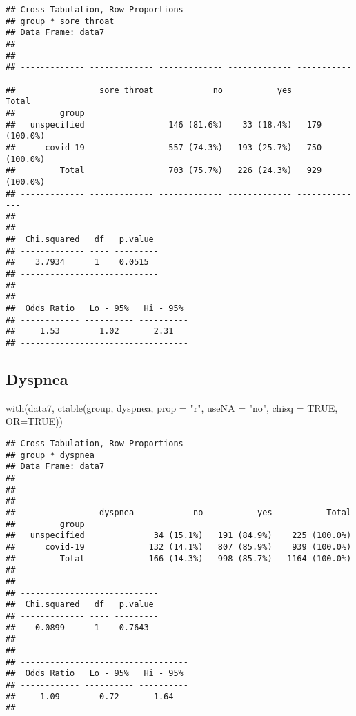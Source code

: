 \documentclass[
]{article}
\newenvironment{Shaded}{\begin{snugshade}}{\end{snugshade}}
\newcommand{\AttributeTok}[1]{\textcolor[rgb]{0.77,0.63,0.00}{#1}}
\newcommand{\ConstantTok}[1]{\textcolor[rgb]{0.00,0.00,0.00}{#1}}
\newcommand{\FunctionTok}[1]{\textcolor[rgb]{0.00,0.00,0.00}{#1}}
\newcommand{\NormalTok}[1]{#1}
\newcommand{\StringTok}[1]{\textcolor[rgb]{0.31,0.60,0.02}{#1}}
\begin{document}
\begin{verbatim}
## Cross-Tabulation, Row Proportions  
## group * sore_throat  
## Data Frame: data7  
## 
## 
## ------------- ------------- ------------- ------------- --------------
##                 sore_throat            no           yes          Total
##         group                                                         
##   unspecified                 146 (81.6%)    33 (18.4%)   179 (100.0%)
##      covid-19                 557 (74.3%)   193 (25.7%)   750 (100.0%)
##         Total                 703 (75.7%)   226 (24.3%)   929 (100.0%)
## ------------- ------------- ------------- ------------- --------------
## 
## ----------------------------
##  Chi.squared   df   p.value 
## ------------- ---- ---------
##    3.7934      1    0.0515  
## ----------------------------
## 
## ----------------------------------
##  Odds Ratio   Lo - 95%   Hi - 95% 
## ------------ ---------- ----------
##     1.53        1.02       2.31   
## ----------------------------------
\end{verbatim}

\hypertarget{dyspnea}{%
\subsection{Dyspnea}\label{dyspnea}}

\begin{Shaded}
\begin{Highlighting}[]
\FunctionTok{with}\NormalTok{(data7, }\FunctionTok{ctable}\NormalTok{(group, dyspnea, }\AttributeTok{prop =} \StringTok{"r"}\NormalTok{, }\AttributeTok{useNA =} \StringTok{"no"}\NormalTok{, }\AttributeTok{chisq =} \ConstantTok{TRUE}\NormalTok{, }\AttributeTok{OR=}\ConstantTok{TRUE}\NormalTok{))}
\end{Highlighting}
\end{Shaded}

\begin{verbatim}
## Cross-Tabulation, Row Proportions  
## group * dyspnea  
## Data Frame: data7  
## 
## 
## ------------- --------- ------------- ------------- ---------------
##                 dyspnea            no           yes           Total
##         group                                                      
##   unspecified              34 (15.1%)   191 (84.9%)    225 (100.0%)
##      covid-19             132 (14.1%)   807 (85.9%)    939 (100.0%)
##         Total             166 (14.3%)   998 (85.7%)   1164 (100.0%)
## ------------- --------- ------------- ------------- ---------------
## 
## ----------------------------
##  Chi.squared   df   p.value 
## ------------- ---- ---------
##    0.0899      1    0.7643  
## ----------------------------
## 
## ----------------------------------
##  Odds Ratio   Lo - 95%   Hi - 95% 
## ------------ ---------- ----------
##     1.09        0.72       1.64   
## ----------------------------------
\end{verbatim}
\end{document}
